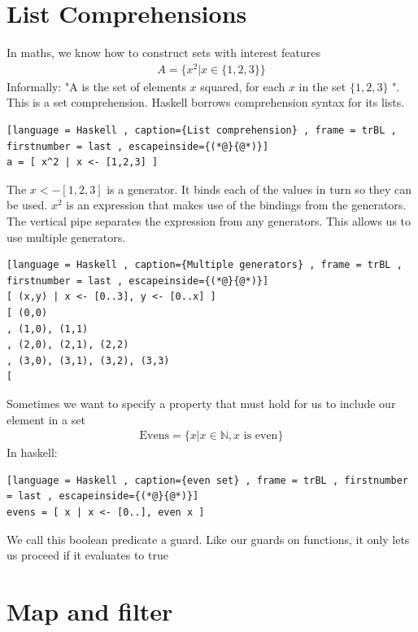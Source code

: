 \documentclass[a4paper]{article}
\theoremstyle{plain}
\theoremstyle{definition}
\theoremstyle{remark}
\begin{document}
\section{List Comprehensions}
In maths, we know how to construct sets with interest features
\begin{align*}
	A = \{ x^2 | x \in \{1,2,3\}\}
\end{align*}
Informally: "A is the set of elements $x$ squared, for each $x$ in the set $\{1,2,3\}$ ". This is a set comprehension.  Haskell borrows comprehension syntax for its lists.
\begin{lstlisting}[language = Haskell , caption={List comprehension} , frame = trBL , firstnumber = last , escapeinside={(*@}{@*)}]
a = [ x^2 | x <- [1,2,3] ]
\end{lstlisting}
The $x <- [1,2,3]$ is a generator. It binds each of the values in turn so they can be used. $x^2$ is an expression that makes use of the bindings from the generators. The vertical pipe separates the expression from any generators. This allows us to use multiple generators.
\begin{lstlisting}[language = Haskell , caption={Multiple generators} , frame = trBL , firstnumber = last , escapeinside={(*@}{@*)}]
[ (x,y) | x <- [0..3], y <- [0..x] ]
[ (0,0)
, (1,0), (1,1)
, (2,0), (2,1), (2,2)
, (3,0), (3,1), (3,2), (3,3)
[
\end{lstlisting}
Sometimes we want to specify a property that must hold for us to include our element in a set
\begin{align*}
	\text{Evens}= \{ x | x \in \mathbb{N}, x \text{ is even} \}
\end{align*}
In haskell:
\begin{lstlisting}[language = Haskell , caption={even set} , frame = trBL , firstnumber = last , escapeinside={(*@}{@*)}]
evens = [ x | x <- [0..], even x ]
\end{lstlisting}
We call this boolean predicate a guard. Like our guards on functions, it only lets us proceed if it evaluates to true
\section{Map and filter}
\end{document}
